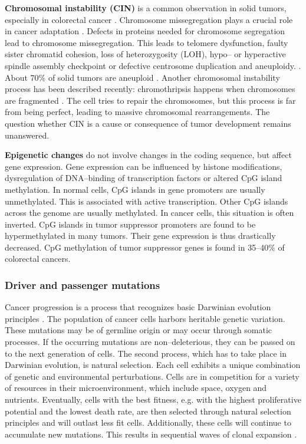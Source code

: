     \textbf{Chromosomal instability (CIN)} is a common observation in solid
    tumors, especially in colorectal cancer {\cite{cin_crc}}. Chromosome
    missegregation plays a crucial role in cancer adaptation
    {\cite{chromosome_missegregation}}. Defects in proteins needed for
    chromosome segregation lead to chromosome missegregation. This leads to
    telomere dysfunction, faulty sister chromatid cohesion, loss of
    heterozygosity (LOH), hypo-- or hyperactive spindle assembly checkpoint or
    defective centrosome duplication and aneuploidy. {\cite{cin_crc}}. About
    70\% of solid tumors are aneuploid {\cite{aneuploidy}}. Another chromosomal
    instability process has been described recently: chromothripsis happens when
    chromosomes are fragmented {\cite{chromothripsis_1}}
    {\cite{chromothripsis_2}} {\cite{chromothripsis_2}}. The cell tries to
    repair the chromosomes, but this process is far from being perfect, leading
    to massive chromosomal rearrangements. The question whether CIN is a cause
    or consequence of tumor development remains unanswered.

    \textbf{Epigenetic changes} do not involve changes in the coding sequence,
    but affect gene expression. Gene expression can be influenced by histone
    modifications, dysregulation of DNA--binding of transcription factors or
    altered CpG island methylation. In normal cells, CpG islands in gene
    promoters are usually unmethylated. This is associated with active
    transcription. Other CpG islands across the genome are usually methylated.
    In cancer cells, this situation is often inverted. CpG islands in tumor
    suppressor promoters are found to be hypermethylated in many tumors. Their
    gene expression is thus drastically decreased. CpG methylation of tumor
    suppressor genes is found in 35--40\%  of colorectal cancers.

    \subsubsection{Driver and passenger mutations}

      Cancer progression is a process that recognizes basic Darwinian evolution
      principles {\cite{clonal_evolution}} {\cite{darwinian_models}}
      {\cite{war_zone}} {\cite{cancer_models}}. The population of cancer cells
      harbors heritable genetic variation. These mutations may be of germline
      origin or may occur through somatic processes. If the occurring mutations
      are non--deleterious, they can be passed on to the next generation of
      cells. The second process, which has to take place in Darwinian evolution,
      is natural selection. Each cell exhibits a unique combination of genetic
      and environmental perturbations. Cells are in competition for a variety of
      resources in their microenvironment, which include space, oxygen and
      nutrients. Eventually, cells with the best fitness, e.g. with the highest
      proliferative potential and the lowest death rate, are then selected
      through natural selection principles and will outlast less fit
      cells. Additionally, these cells will continue to accumulate new
      mutations. This results in sequential waves of clonal expansion
      {\cite{clonal_evolution}}.

